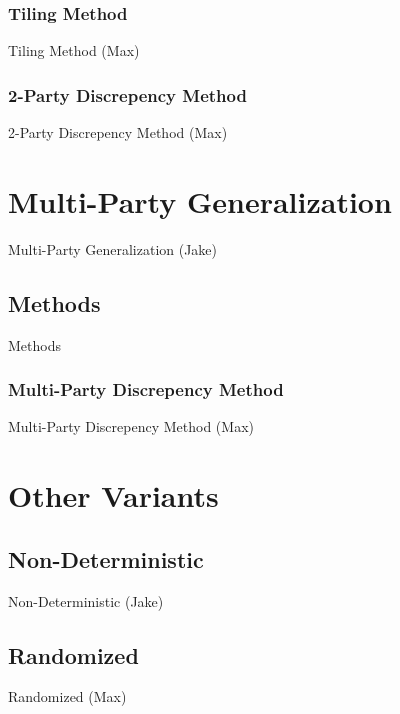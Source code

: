 \documentclass{beamer}
\begin{document}
\subsubsection{Tiling Method}

\begin{frame}{Tiling Method (Max)}
\TODO
\end{frame}

\subsubsection{2-Party Discrepency Method}

\begin{frame}{2-Party Discrepency Method (Max)}
\TODO
\end{frame}

\section{Multi-Party Generalization}

\begin{frame}{Multi-Party Generalization (Jake)}
\TODO
\end{frame}

\subsection{Methods}

\begin{frame}{Methods}
\TODO
\tableofcontents[currentsection]
\end{frame}

\subsubsection{Multi-Party Discrepency Method}

\begin{frame}{Multi-Party Discrepency Method (Max)}
\TODO
\end{frame}

\section{Other Variants}

\subsection{Non-Deterministic}

\begin{frame}{Non-Deterministic (Jake)}
\TODO
\end{frame}

\subsection{Randomized}

\begin{frame}{Randomized (Max)}
\TODO
\end{frame}
\end{document}

